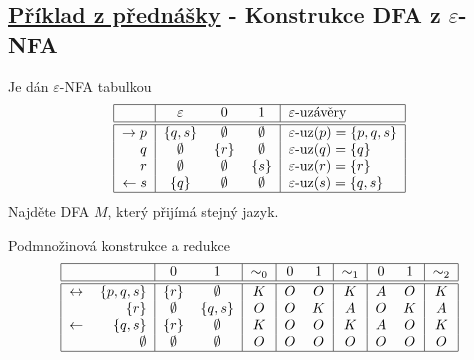 \subsection{\href{https://youtu.be/Hbi2ao1mFBc?list=PLQL6z4JeTTQkLuzI78OTnfYBclE1g0UjS&t=1823}{Příklad z přednášky} - Konstrukce DFA z \texorpdfstring{$\varepsilon$}{e}-NFA}
Je dán $\varepsilon$-NFA tabulkou
\[
    \begin{tabular}{|r|c c c|l|}
        \hline
        & $\varepsilon$ & $0$ & $1$ & $\varepsilon$-uzávěry \\ \hline \hline
        $\rightarrow p$& $\bc{q,s}$  & $\emptyset$ & $\emptyset$ & $\varepsilon\text{-uz}(p) = \bc{p,q,s}$ \\
        $q$            & $\emptyset$ & $\bc{r}$    & $\emptyset$ & $\varepsilon\text{-uz}(q) = \bc{q}$ \\
        $r$            & $\emptyset$ & $\emptyset$ & $\bc{s}$    & $\varepsilon\text{-uz}(r) = \bc{r}$ \\
        $\leftarrow s$ & $\bc{q}$    & $\emptyset$ & $\emptyset$ & $\varepsilon\text{-uz}(s) = \bc{q,s}$\\
        \hline
    \end{tabular}
\]
Najděte DFA $M$, který přijímá stejný jazyk.

\begin{multicols}{2}
    Podmnožinová konstrukce a redukce
    \[
        \begin{tabular}{|r r|c c|c|c c|c|c c|c|c c|c|}
            \hline
            & $ $ & $0$ & $1$ & $\sim_0$ & $0$ & $1$ & $\sim_1$ & $0$ & $1$ & $\sim_2$ \\ \hline \hline
            $\leftrightarrow$ &$\bc{p,q,s}$ & $\bc{r}$& $\emptyset$ & $K$ & $O$ & $O$ & $K$ & $A$ & $O$ & $K$ \\
                          &$\bc{r}$     & $\emptyset$ & $\bc{q,s}$  & $O$ & $O$ & $K$ & $A$ & $O$ & $K$ & $A$ \\
            $\leftarrow$  &$\bc{q,s}$   & $\bc{r}$    & $\emptyset$ & $K$ & $O$ & $O$ & $K$ & $A$ & $O$ & $K$ \\
                          &$\emptyset$  & $\emptyset$ & $\emptyset$ & $O$ & $O$ & $O$ & $O$ & $O$ & $O$ & $O$ \\
            \hline
        \end{tabular}
    \]

\columnbreak

    \hspace*{2cm}
\end{multicols}

